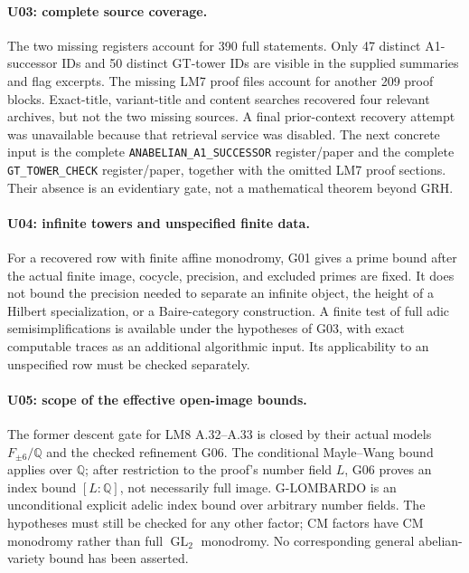 \documentclass[11pt,a4paper]{article}
\begin{document}
\paragraph{U03: complete source coverage.}
The two missing registers account for 390 full statements. Only
47 distinct A1-successor IDs and 50 distinct GT-tower IDs are visible
in the supplied summaries and flag excerpts. The missing LM7
proof files account for another 209 proof blocks. Exact-title,
variant-title and content searches recovered four relevant archives,
but not the two missing sources. A final prior-context recovery
attempt was unavailable because that retrieval service was disabled.
The next concrete input is the complete
\texttt{ANABELIAN\_A1\_SUCCESSOR} register/paper and the complete
\texttt{GT\_TOWER\_CHECK} register/paper, together with the omitted
LM7 proof sections. Their absence is an evidentiary gate, not a
mathematical theorem beyond GRH.

\paragraph{U04: infinite towers and unspecified finite data.}
For a recovered row with finite affine monodromy, G01 gives a
prime bound after the actual finite image, cocycle, precision,
and excluded primes are fixed. It does not bound the precision
needed to separate an infinite object, the height of a Hilbert
specialization, or a Baire-category construction. A finite test of
full adic semisimplifications is available under the hypotheses of
G03, with exact computable traces as an additional algorithmic input.
Its applicability to an unspecified row must be checked separately.

\paragraph{U05: scope of the effective open-image bounds.}
The former descent gate for LM8 A.32--A.33 is closed by their actual
models $F_{\pm6}/\mathbb Q$ and the checked refinement G06.
The conditional Mayle--Wang bound applies over $\mathbb Q$; after
restriction to the proof's number field $L$, G06 proves an index
bound $[L:\mathbb Q]$, not necessarily full image.
G-LOMBARDO is an unconditional explicit adelic index bound over
arbitrary number fields. The hypotheses must still be checked for
any other factor; CM factors have CM monodromy rather than full
$\operatorname{GL}_2$ monodromy. No corresponding general abelian-variety
bound has been asserted.
\end{document}
